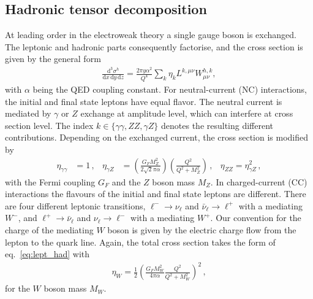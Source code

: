 \documentclass[11pt,a4paper]{article}
\newcommand{\dd}{\mathrm{d}}
\newcommand{\NC}{\mathrm{NC}}
\newcommand{\CC}{\mathrm{CC}}
\begin{document}
\subsection{Hadronic tensor decomposition}
At leading order in the electroweak theory a single gauge boson is exchanged.
The leptonic and hadronic parts
consequently factorise, and the cross section is given by the general form
\begin{align}
\frac{\dd^3\sigma^h}{\dd x \, \dd y \, \dd z} = \frac{2\pi y \alpha^2}{Q^4} \sum_k \eta_k L^{k,\mu\nu} W_{\mu\nu}^{h,k},
\label{eq:lept_had}
\end{align}
with $\alpha$ being the QED coupling constant.
For neutral-current ($\NC$) interactions, the initial and final state leptons have equal flavor. The neutral current is mediated by $\gamma$ or $Z$ exchange at amplitude level, which can interfere at cross section level.
The index $k \in \{\gamma\gamma, ZZ, \gamma Z\}$ denotes the resulting different contributions.
Depending on the exchanged current, the cross section is modified by
\begin{align}
\eta_{\gamma\gamma} &= 1 \, , &
\eta_{\gamma Z} & = \left(\frac{G_FM_Z^2}{2\sqrt{2}\pi \alpha}\right) \left(\frac{Q^2}{Q^2+M_Z^2}\right)\, ,&
\eta_{ZZ} = \eta_{\gamma Z}^2 \,  ,
\end{align}
with the Fermi coupling $G_F$ and the $Z$ boson mass $M_Z$.
In charged-current ($\CC$) interactions the flavours of the initial and final state leptons are different.
There are four different leptonic transitions, $\ell^-\to \nu_\ell$ and $\bar{\nu}_\ell\to \ell^+$ with a mediating $W^-$, and $\ell^+\to \bar{\nu}_\ell$ and $\nu_\ell \to \ell^-$ with a mediating $W^+$.
Our convention for the charge of the mediating $W$ boson is given by the electric charge flow from the lepton to the quark line.
Again, the total cross section takes the form of eq.~\eqref{eq:lept_had} with
\begin{align}
\eta_W = \frac{1}{2}\left( \frac{G_F M_W^2}{4\pi \alpha}\frac{Q^2}{Q^2+M_W^2}\right)^2 \, ,
\end{align}
for the $W$ boson mass $M_W$.
\end{document}
